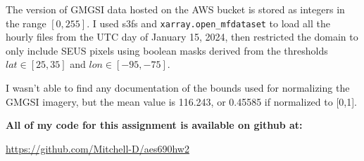 \documentclass[11pt]{article}
\begin{document}
The version of GMGSI data hosted on the AWS bucket is stored as integers in the range $[0,255]$. I used s3fs and \texttt{xarray.open\_mfdataset} to load all the hourly files from the UTC day of January 15, 2024, then restricted the domain to only include SEUS pixels using boolean masks derived from the thresholds $lat \in [25,35]$ and $lon \in [-95,-75]$.

I wasn't able to find any documentation of the bounds used for normalizing the GMGSI imagery, but the mean value is 116.243, or 0.45585 if normalized to [0,1].

\vspace{1em}
\centering\large
\textbf{All of my code for this assignment is available on github at:}

\centering\large
\url{https://github.com/Mitchell-D/aes690hw2}
\end{document}
